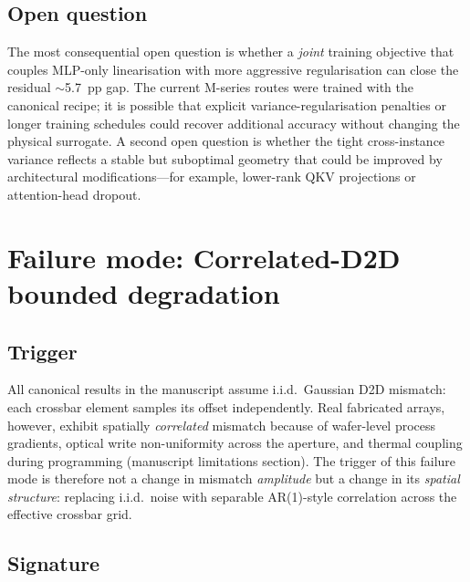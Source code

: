 \subsection{Open question}

The most consequential open question is whether a \emph{joint} training objective that couples MLP-only linearisation with more aggressive regularisation can close the residual $\sim$5.7~pp gap.  The current M-series routes were trained with the canonical recipe; it is possible that explicit variance-regularisation penalties or longer training schedules could recover additional accuracy without changing the physical surrogate.  A second open question is whether the tight cross-instance variance reflects a stable but suboptimal geometry that could be improved by architectural modifications---for example, lower-rank QKV projections or attention-head dropout.


\section{Failure mode: Correlated-D2D bounded degradation}
\label{sec:failure-correlated-d2d}

\subsection{Trigger}

All canonical results in the manuscript assume i.i.d.~Gaussian D2D mismatch: each crossbar element samples its offset independently.  Real fabricated arrays, however, exhibit spatially \emph{correlated} mismatch because of wafer-level process gradients, optical write non-uniformity across the aperture, and thermal coupling during programming (manuscript limitations section).  The trigger of this failure mode is therefore not a change in mismatch \emph{amplitude} but a change in its \emph{spatial structure}: replacing i.i.d.~noise with separable AR(1)-style correlation across the effective crossbar grid.

\subsection{Signature}

